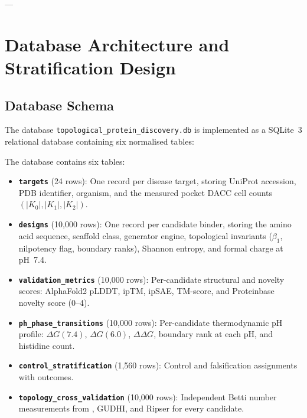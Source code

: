 ---

\section{Database Architecture and Stratification Design}
\label{sec:database_architecture}

\subsection{Database Schema}
\label{subsec:db_schema}

The database \texttt{topological\_protein\_discovery.db} is implemented as
a SQLite~3 relational database containing six normalised tables:

\begin{definition}
\label{def:db_schema}
The database contains six tables:
\begin{itemize}[noitemsep]
    \item \textbf{\texttt{targets}} (24 rows): One record per disease target,
          storing UniProt accession, PDB identifier, organism, and the measured
          pocket DACC cell counts $(|K_0|, |K_1|, |K_2|)$.
    \item \textbf{\texttt{designs}} (10,000 rows): One record per candidate
          binder, storing the amino acid sequence, scaffold class, generator
          engine, topological invariants ($\beta_1$, nilpotency flag,
          boundary ranks), Shannon entropy, and formal charge at pH~7.4.
    \item \textbf{\texttt{validation\_metrics}} (10,000 rows): Per-candidate
          structural and novelty scores: AlphaFold2 pLDDT, ipTM, ipSAE,
          TM-score, and Proteinbase novelty score (0--4).
    \item \textbf{\texttt{ph\_phase\_transitions}} (10,000 rows): Per-candidate
          thermodynamic pH profile: $\Delta G(7.4)$, $\Delta G(6.0)$,
          $\Delta\Delta G$, boundary rank at each pH, and histidine count.
    \item \textbf{\texttt{control\_stratification}} (1,560 rows): Control and
          falsification assignments with outcomes.
    \item \textbf{\texttt{topology\_cross\_validation}} (10,000 rows):
          Independent Betti number measurements from \PLQ{}, GUDHI, and
          Ripser for every candidate.
\end{itemize}
\end{definition}

